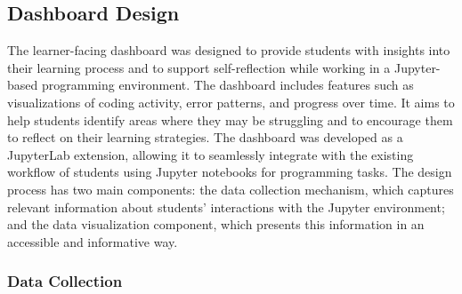 \subsection{Dashboard Design}

The learner-facing dashboard was designed to provide students with insights into their learning process and to support self-reflection while working in a Jupyter-based programming environment. The dashboard includes features such as visualizations of coding activity, error patterns, and progress over time. It aims to help students identify areas where they may be struggling and to encourage them to reflect on their learning strategies. The dashboard was developed as a JupyterLab extension, allowing it to seamlessly integrate with the existing workflow of students using Jupyter notebooks for programming tasks. The design process has two main components: the data collection mechanism, which captures relevant information about students' interactions with the Jupyter environment; and the data visualization component, which presents this information in an accessible and informative way.

\subsubsection{Data Collection}

